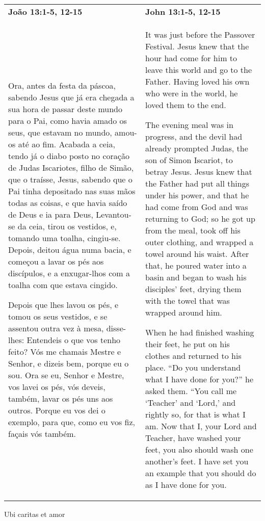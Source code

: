 \begin{longtable}{p{1.7in}p{1.7in}}
  {\bf João 13:1-5, 12-15} & \hfill {\bf John 13:1-5, 12-15}\\
  Ora, antes da festa da páscoa, sabendo Jesus que já era chegada a sua hora de passar deste mundo para o Pai, como havia amado os seus, que estavam no mundo, amou-os até ao fim. Acabada a ceia, tendo já o diabo posto no coração de Judas Iscariotes, filho de Simão, que o traísse, Jesus, sabendo que o Pai tinha depositado nas suas mãos todas as coisas, e que havia saído de Deus e ia para Deus, Levantou-se da ceia, tirou os vestidos, e, tomando uma toalha, cingiu-se. Depois, deitou água numa bacia, e começou a lavar os pés aos discípulos, e a enxugar-lhos com a toalha com que estava cingido. 
  
  Depois que lhes lavou os pés, e tomou os seus vestidos, e se assentou outra vez à mesa, disse-lhes: Entendeis o que vos tenho feito? Vós me chamais Mestre e Senhor, e dizeis bem, porque eu o sou. Ora se eu, Senhor e Mestre, vos lavei os pés, vós deveis, também, lavar os pés uns aos outros. Porque eu vos dei o exemplo, para que, como eu vos fiz, façais vós também. 
  &  
It was just before the Passover Festival. Jesus knew that the hour had come for him to leave this world and go to the Father. Having loved his own who were in the world, he loved them to the end.

The evening meal was in progress, and the devil had already prompted Judas, the son of Simon Iscariot, to betray Jesus. Jesus knew that the Father had put all things under his power, and that he had come from God and was returning to God; so he got up from the meal, took off his outer clothing, and wrapped a towel around his waist. After that, he poured water into a basin and began to wash his disciples’ feet, drying them with the towel that was wrapped around him.

When he had finished washing their feet, he put on his clothes and returned to his place. “Do you understand what I have done for you?” he asked them. “You call me ‘Teacher’ and ‘Lord,’ and rightly so, for that is what I am.  Now that I, your Lord and Teacher, have washed your feet, you also should wash one another’s feet. I have set you an example that you should do as I have done for you.
\end{longtable}

\newpage 



Ubi caritas et amor

